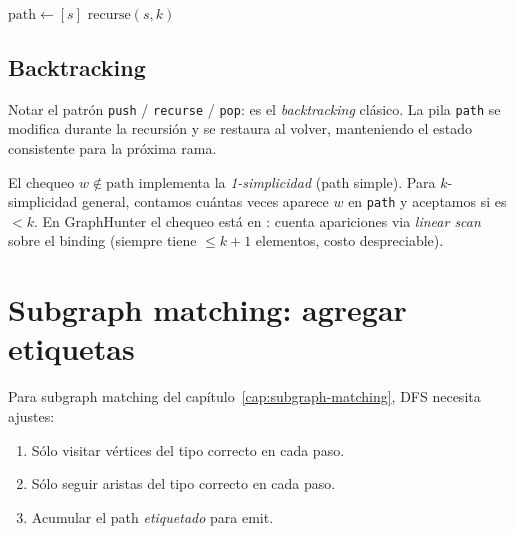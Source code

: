 \begin{algorithm}[H]
\caption{DFS \emph{enumerate-paths}, longitud exacta \(k\)}
\(\mathrm{path} \leftarrow [s]\)\;
\(\mathrm{recurse}(s, k)\)\;
\BlankLine
{}
\end{algorithm}

\subsection{Backtracking}

Notar el patrón \texttt{push} / \texttt{recurse} / \texttt{pop}: es
el \emph{backtracking} clásico. La pila \texttt{path} se modifica
durante la recursión y se restaura al volver, manteniendo el
estado consistente para la próxima rama.

\begin{nota}
El chequeo \(w \notin \mathrm{path}\) implementa la
\emph{1-simplicidad} (path simple). Para \(k\)-simplicidad general,
contamos cuántas veces aparece \(w\) en \texttt{path} y aceptamos si
es \(< k\). En GraphHunter el chequeo está en
: cuenta apariciones via
\emph{linear scan} sobre el binding (siempre tiene
\(\leq k+1\) elementos, costo despreciable).
\end{nota}

\section{Subgraph matching: agregar etiquetas}

Para subgraph matching del capítulo~\ref{cap:subgraph-matching}, DFS
necesita ajustes:

\begin{enumerate}
    \item Sólo visitar vértices del tipo correcto en cada paso.
    \item Sólo seguir aristas del tipo correcto en cada paso.
    \item Acumular el path \emph{etiquetado} para emit.
\end{enumerate}


